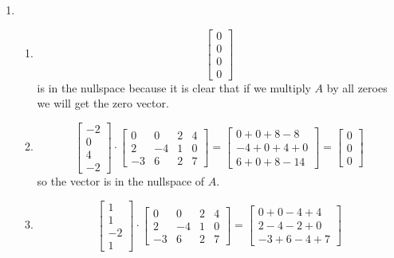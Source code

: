 \documentclass[12pt,a4paper]{exam}
\begin{document}
\begin{enumerate}
\begin{solution}
  \begin{enumerate}
    \item
      \begin{enumerate}
        \item \[ \left[\begin{matrix} 0 \\ 0 \\ 0 \\ 0 \end{matrix}\right] \] is in the nullspace because it is clear that if we multiply $A$ by all zeroes we will get the zero vector.
        \item \[ \left[\begin{matrix} -2 \\ 0 \\ 4 \\ -2 \end{matrix}\right] \cdot \left[\begin{matrix}
          0 & 0 & 2 & 4 \\
          2 & -4 & 1 & 0 \\
          -3 & 6 & 2 & 7
          \end{matrix}\right]
          =
          \left[\begin{matrix} 0+0+8-8 \\ -4+0+4+0 \\ 6+0+8-14 \end{matrix}\right]
          =
          \left[\begin{matrix} 0 \\ 0 \\ 0 \end{matrix}\right]
          \] so the vector is in the nullspace of $A$.
        \item \[ \left[\begin{matrix} 1 \\ 1 \\ -2 \\ 1 \end{matrix}\right] \cdot \left[\begin{matrix}
          0 & 0 & 2 & 4 \\
          2 & -4 & 1 & 0 \\
          -3 & 6 & 2 & 7
          \end{matrix}\right]
          =
          \left[\begin{matrix} 0+0-4+4 \\ 2-4-2+0 \\ -3+6-4+7 \end{matrix}\right]
\]
\end{enumerate}
\end{enumerate}
\end{solution}
\end{enumerate}
\end{document}
